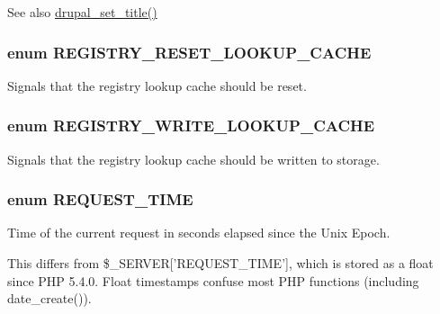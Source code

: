 \begin{DoxySeeAlso}{See also}
\hyperlink{bootstrap_8inc_a1994d49eb621df71fe1306e13b7e4910}{drupal\_\-set\_\-title()} 
\end{DoxySeeAlso}
\hypertarget{bootstrap_8inc_a6045f5b23cf5e2c5e6ed8a2effaa7bfb}{
\subsubsection[{REGISTRY\_\-RESET\_\-LOOKUP\_\-CACHE}]{\setlength{\rightskip}{0pt plus 5cm}enum {\bf REGISTRY\_\-RESET\_\-LOOKUP\_\-CACHE}}}
\label{bootstrap_8inc_a6045f5b23cf5e2c5e6ed8a2effaa7bfb}
Signals that the registry lookup cache should be reset. \hypertarget{bootstrap_8inc_ab6acafa683cd17da2d120b9faf3e04c2}{
\subsubsection[{REGISTRY\_\-WRITE\_\-LOOKUP\_\-CACHE}]{\setlength{\rightskip}{0pt plus 5cm}enum {\bf REGISTRY\_\-WRITE\_\-LOOKUP\_\-CACHE}}}
\label{bootstrap_8inc_ab6acafa683cd17da2d120b9faf3e04c2}
Signals that the registry lookup cache should be written to storage. \hypertarget{bootstrap_8inc_a08bcd0b03e31c17fb7d58786bef2b7f4}{
\subsubsection[{REQUEST\_\-TIME}]{\setlength{\rightskip}{0pt plus 5cm}enum {\bf REQUEST\_\-TIME}}}
\label{bootstrap_8inc_a08bcd0b03e31c17fb7d58786bef2b7f4}
Time of the current request in seconds elapsed since the Unix Epoch.

This differs from \$\_\-SERVER\mbox{[}'REQUEST\_\-TIME'\mbox{]}, which is stored as a float since PHP 5.4.0. Float timestamps confuse most PHP functions (including date\_\-create()).


